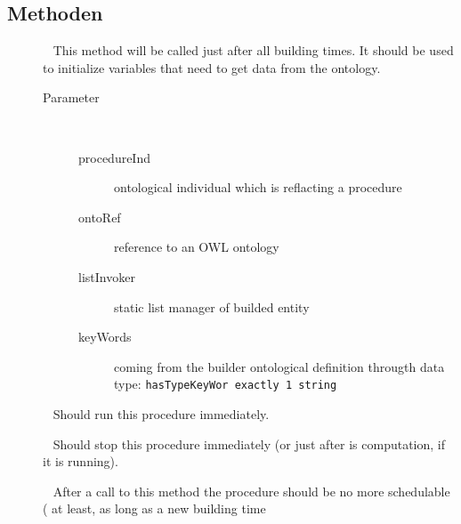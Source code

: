 \subsection{Methoden}
\begin{description}
\item[{\label{ontologyFramework.OFProcedureManagment.OFProcedureInterface.initialise(org.semanticweb.owlapi.model.OWLNamedIndividual,ontologyFramework.OFContextManagement.OWLReferences,ontologyFramework.OFRunning.OFInvokingManager.OFBuildedListInvoker,java.lang.String[])}}]
~ This method will be called just after all
 building times. It should be used to initialize 
 variables that need to get data from 
 the ontology.
\begin{description}
\item[Parameter] ~
\begin{description}
\item[procedureInd]
ontological individual which is reflacting a procedure
\item[ontoRef]
reference to an OWL ontology
\item[listInvoker]
static list manager of builded entity
\item[keyWords]
coming from the builder ontological definition througth data type:
 \verb!hasTypeKeyWor exactly 1 string!
\end{description}
\end{description}
\item[{\label{ontologyFramework.OFProcedureManagment.OFProcedureInterface.run()}}]
~ Should run this procedure immediately.
\item[{\label{ontologyFramework.OFProcedureManagment.OFProcedureInterface.stop()}}]
~ Should stop this procedure immediately 
  (or just after is computation, if it is running).
\item[{\label{ontologyFramework.OFProcedureManagment.OFProcedureInterface.shotdown()}}]
~ After a call to this method the procedure should be
  no more schedulable ( at least, as long as a new building time

\end{description}
